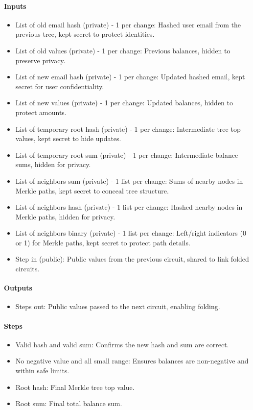 \paragraph{Inputs}
\begin{itemize}
   \item List of old email hash (private) - 1 per change: Hashed user email from the previous tree, kept secret to protect identities.
   \item List of old values (private) - 1 per change: Previous balances, hidden to preserve privacy.
   \item List of new email hash (private) - 1 per change: Updated hashed email, kept secret for user confidentiality.
   \item List of new values (private) - 1 per change: Updated balances, hidden to protect amounts.
   \item List of temporary root hash (private) - 1 per change: Intermediate tree top values, kept secret to hide updates.
   \item List of temporary root sum (private) - 1 per change: Intermediate balance sums, hidden for privacy.
   \item List of neighbors sum (private) - 1 list per change: Sums of nearby nodes in Merkle paths, kept secret to conceal tree structure.
   \item List of neighbors hash (private) - 1 list per change: Hashed nearby nodes in Merkle paths, hidden for privacy.
   \item List of neighbors binary (private) - 1 list per change: Left/right indicators (0 or 1) for Merkle paths, kept secret to protect path details.
   \item Step in (public): Public values from the previous circuit, shared to link folded circuits.
   \end{itemize}

\paragraph{Outputs}
\begin{itemize}
   \item Steps out: Public values passed to the next circuit, enabling folding.
   \end{itemize}

\paragraph{Steps}
\begin{itemize}
   \item Valid hash and valid sum: Confirms the new hash and sum are correct.
   \item No negative value and all small range: Ensures balances are non-negative and within safe limits.
   \item Root hash: Final Merkle tree top value.
   \item Root sum: Final total balance sum.
   \end{itemize}




